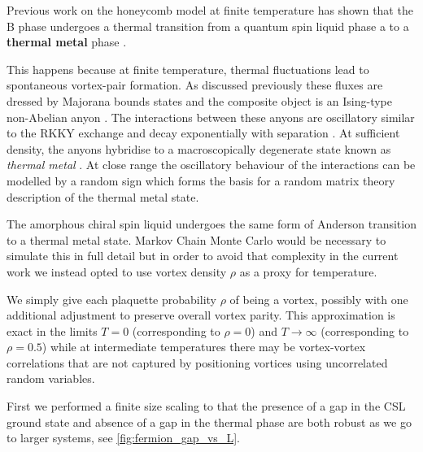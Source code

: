 Previous work on the honeycomb model at finite temperature has shown that the B phase undergoes a thermal transition from a quantum spin liquid phase a to a \textbf{thermal metal} phase \autocite{selfThermallyInducedMetallic2019}.

This happens because at finite temperature, thermal fluctuations lead to spontaneous vortex-pair formation. As discussed previously these fluxes are dressed by Majorana bounds states and the composite object is an Ising-type non-Abelian anyon \autocite{Beenakker2013}. The interactions between these anyons are oscillatory similar to the RKKY exchange and decay exponentially with separation \autocite{Laumann2012,Lahtinen_2011,lahtinenTopologicalLiquidNucleation2012}. At sufficient density, the anyons hybridise to a macroscopically degenerate state known as \emph{thermal metal} \autocite{Laumann2012}. At close range the oscillatory behaviour of the interactions can be modelled by a random sign which forms the basis for a random matrix theory description of the thermal metal state.

The amorphous chiral spin liquid undergoes the same form of Anderson transition to a thermal metal state. Markov Chain Monte Carlo would be necessary to simulate this in full detail \autocite{selfThermallyInducedMetallic2019} but in order to avoid that complexity in the current work we instead opted to use vortex density \(\rho\) as a proxy for temperature.

We simply give each plaquette probability \(\rho\) of being a vortex, possibly with one additional adjustment to preserve overall vortex parity. This approximation is exact in the limits \(T = 0\) (corresponding to \(\rho = 0\)) and \(T \to \infty\) (corresponding to \(\rho = 0.5\)) while at intermediate temperatures there may be vortex-vortex correlations that are not captured by positioning vortices using uncorrelated random variables.

First we performed a finite size scaling to that the presence of a gap in the CSL ground state and absence of a gap in the thermal phase are both robust as we go to larger systems, see \cref{fig:fermion_gap_vs_L}.

